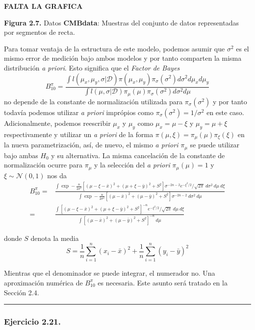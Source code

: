 \documentclass[12pt,]{article}
\begin{document}
\textbf{FALTA LA GRAFICA}

\textbf{Figura 2.7.} Datos \textbf{CMBdata}: Muestras del conjunto de
datos representadas por segmentos de recta.

Para tomar ventaja de la estructura de este modelo, podemos asumir que
\(\sigma^2\) es el mismo error de medición bajo ambos modelos y por
tanto comparten la misma distribución \emph{a priori}. Esto significa
que el \emph{Factor de Bayes} \[
B_{10}^\pi=\frac{\int l(\mu_x,\mu_y,\sigma|\mathcal{D})\pi(\mu_x,\mu_y)\pi_\sigma(\sigma^2)d\sigma^2d\mu_x d\mu_y}{\int l(\mu,\sigma|\mathcal{D})\pi_\mu(\mu)\pi_\sigma(\sigma^2)d\sigma^2d\mu}
\] no depende de la constante de normalización utilizada para
\(\pi_\sigma(\sigma^2)\) y por tanto todavía podemos utilizar \emph{a
priori} imprópios como \(\pi_\sigma(\sigma^2)=1/\sigma^2\) en este caso.
Adicionalmente, podemos reescribir \(\mu_x\) y \(\mu_y\) como
\(\mu_x=\mu-\xi\) y \(\mu_y=\mu+\xi\) respectivamente y utilizar un
\emph{a priori} de la forma \(\pi(\mu,\xi)=\pi_\mu(\mu)\pi_\xi(\xi)\) en
la nueva parametrización, así, de nuevo, el mismo \emph{a priori}
\(\pi_\mu\) se puede utilizar bajo ambas \(H_0\) y su alternativa. La
misma cancelación de la constante de normalización ocurre para
\(\pi_\mu\) y la selección del \emph{a priori} \(\pi_\mu(\mu)=1\) y
\(\xi\sim\mathcal{N}(0,1)\) nos da \[
\begin{array}{rl}
B_{10}^\pi=&\frac{\displaystyle \int\exp-\frac{n}{2\sigma^2}[(\mu-\xi-\bar{x})^2+(\mu+\xi-\bar{y})^2+S^2]\sigma^{-2n-2}e^{-\xi^2/2}/\sqrt{2\pi}\ d\sigma^2\ d\mu \ d\xi}
{\displaystyle \int\exp-\frac{n}{2\sigma^2}[(\mu-\bar{x})^2+(\mu-\bar{y})^2+S^2]\sigma^{-2n-2}\ d\sigma^2\ d\mu}\\
=&\frac{\displaystyle \int[(\mu-\xi-\bar{x})^2+(\mu+\xi-\bar{y})^2+S^2]^{-n}e^{-\xi^2/2}/\sqrt{2\pi}\ d\mu \ d\xi}
{\displaystyle \int[(\mu-\bar{x})^2+(\mu-\bar{y})^2+S^2]^{-n}\ d\mu}
\end{array}
\]

donde \(S\) denota la media \[
S=\frac{1}{n}\sum_{i=1}^{n}(x_i-\bar{x})^2+\frac{1}{n}\sum_{i=1}^{n}(y_i-\bar{y})^2
\]

Mientras que el denominador se puede integrar, el numerador no. Una
aproximación numérica de \(B_{10}^\pi\) es necesaria. Este asunto será
tratado en la Sección 2.4.

\begin{center}\rule{0.5\linewidth}{\linethickness}\end{center}

\subsubsection{Ejercicio 2.21.}\label{ejercicio-2.21.}
\end{document}
